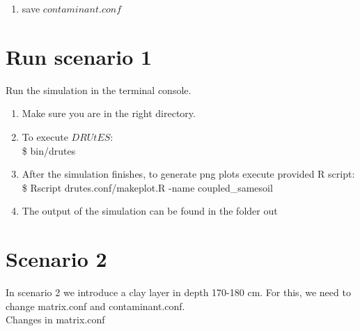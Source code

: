 \begin{enumerate}
{\begin{tabular}{|c | c | c|c |}
			\hline
		\end{tabular}
	}
\item save $contaminant.conf$
\end{enumerate}

\section*{Run scenario 1}
Run the simulation in the terminal console.
\begin{enumerate}
\item Make sure you are in the right directory. 
\item To execute $DRUtES$: \\
\$ bin/drutes
\item After the simulation finishes, to generate png plots execute provided R script: \\
\$ Rscript drutes.conf/makeplot.R -name coupled\_samesoil \\
\item The output of the simulation can be found in the folder out
\end{enumerate}

\section*{Scenario 2}

In scenario 2 we introduce a clay layer in depth 170-180 cm. For this, we need to change matrix.conf and contaminant.conf. \\

Changes in matrix.conf 

